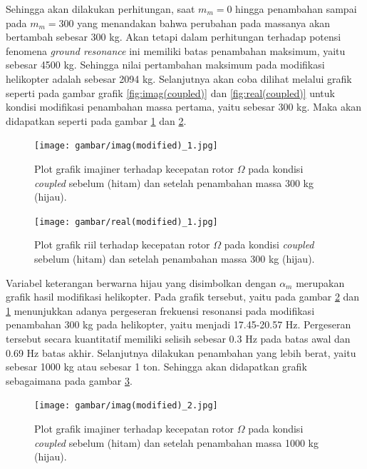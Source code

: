 Sehingga akan dilakukan perhitungan, saat $m_m = 0$ hingga penambahan sampai pada $m_m = 300$ yang menandakan bahwa perubahan pada massanya akan bertambah sebesar 300 kg. Akan tetapi dalam perhitungan terhadap potensi fenomena \textit{ground resonance} ini memiliki batas penambahan maksimum, yaitu sebesar 4500 kg. Sehingga nilai pertambahan maksimum pada modifikasi helikopter adalah sebesar 2094 kg. Selanjutnya akan coba dilihat melalui grafik seperti pada gambar grafik \ref{fig:imag(coupled)} dan \ref{fig:real(coupled)} untuk kondisi modifikasi penambahan massa pertama, yaitu sebesar 300 kg. Maka akan didapatkan seperti pada gambar \ref{fig:imag(modified)_1} dan \ref{fig:real(modified)_1}.

\begin{figure}[H]
	\centering
	\texttt{[image: gambar/imag(modified)\_1.jpg]}
	\caption{Plot grafik imajiner terhadap kecepatan rotor $\Omega$ pada kondisi \textit{coupled} sebelum (hitam) dan setelah penambahan massa 300 kg (hijau).}
	\label{fig:imag(modified)_1}
\end{figure}

\begin{figure}[H]
	\centering
	\texttt{[image: gambar/real(modified)\_1.jpg]}
	\caption{Plot grafik riil terhadap kecepatan rotor $\Omega$ pada kondisi \textit{coupled} sebelum (hitam) dan setelah penambahan massa 300 kg (hijau).}
	\label{fig:real(modified)_1}
\end{figure}

Variabel keterangan berwarna hijau yang disimbolkan dengan $\alpha_m$ merupakan grafik hasil modifikasi helikopter.  Pada grafik tersebut, yaitu pada gambar \ref{fig:real(modified)_1} dan \ref{fig:imag(modified)_1} menunjukkan adanya pergeseran frekuensi resonansi pada modifikasi penambahan 300 kg pada helikopter, yaitu menjadi 17.45-20.57 Hz. Pergeseran tersebut secara kuantitatif memiliki selisih sebesar 0.3 Hz pada batas awal dan 0.69 Hz batas akhir. Selanjutnya dilakukan penambahan yang lebih berat, yaitu sebesar 1000 kg atau sebesar 1 ton. Sehingga akan didapatkan grafik sebagaimana pada gambar \ref{fig:imag(modified)_2}.

\begin{figure}[H]
	\centering
	\texttt{[image: gambar/imag(modified)\_2.jpg]}
	\caption{Plot grafik imajiner terhadap kecepatan rotor $\Omega$ pada kondisi \textit{coupled} sebelum (hitam) dan setelah penambahan massa 1000 kg (hijau).}
	\label{fig:imag(modified)_2}
\end{figure}

